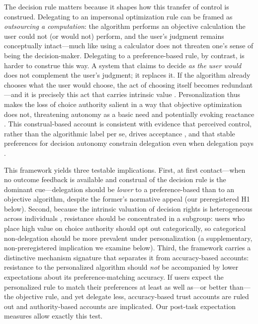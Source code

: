 \documentclass[a4paper, 12pt, fleqn]{article}
\theoremstyle{definition}
\newcommand{\inew}[1]{{\color{blue} #1\color{black}}}
\begin{document}
\inew{The decision rule matters because it shapes how this transfer of control is construed. Delegating to an impersonal optimization rule can be framed as \emph{outsourcing a computation}: the algorithm performs an objective calculation the user could not (or would not) perform, and the user's judgment remains conceptually intact---much like using a calculator does not threaten one's sense of being the decision-maker. Delegating to a preference-based rule, by contrast, is harder to construe this way. A system that claims to decide \emph{as the user would} does not complement the user's judgment; it replaces it. If the algorithm already chooses what the user would choose, the act of choosing itself becomes redundant---and it is precisely this act that carries intrinsic value \citep{Bartling2014,Owens2014}. Personalization thus makes the loss of choice authority salient in a way that objective optimization does not, threatening autonomy as a basic need \citep{DeciRyan2000} and potentially evoking reactance \citep{Brehm1966}. This construal-based account is consistent with evidence that perceived control, rather than the algorithmic label per se, drives acceptance \citep{Schaap2024}, and that stable preferences for decision autonomy constrain delegation even when delegation pays \citep{Ivanova-Stenzel2025}.}

\inew{This framework yields three testable implications. First, at first contact---when no outcome feedback is available and construal of the decision rule is the dominant cue---delegation should be \emph{lower} to a preference-based than to an objective algorithm, despite the former's normative appeal (our preregistered H1 below). Second, because the intrinsic valuation of decision rights is heterogeneous across individuals \citep{Bartling2014,Owens2014}, resistance should be concentrated in a subgroup: users who place high value on choice authority should opt out categorically, so categorical non-delegation should be more prevalent under personalization (a supplementary, non-preregistered implication we examine below). Third, the framework carries a distinctive mechanism signature that separates it from accuracy-based accounts: resistance to the personalized algorithm should \emph{not} be accompanied by lower expectations about its preference-matching accuracy. If users expect the personalized rule to match their preferences at least as well as---or better than---the objective rule, and yet delegate less, accuracy-based trust accounts are ruled out and authority-based accounts are implicated. Our post-task expectation measures allow exactly this test.}
\end{document}
